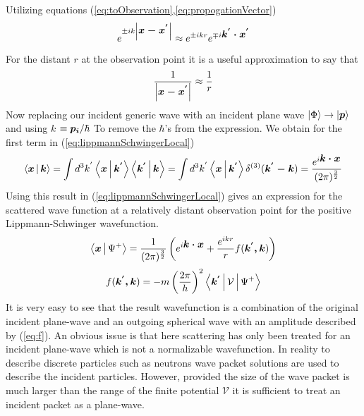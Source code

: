 Utilizing equations (\ref{eq:toObservation},\ref{eq:propogationVector})
\begin{equation}
e^{\pm ik \left|\mbox{\boldmath$x-x^{'}$}\right|} \approx e^{\pm ikr}e^{\mp i \mbox{\boldmath$k^{'}\cdot x^{'}$}}
\label{eq:waveSimplification}
\end{equation}
For the distant $r$ at the observation point it is a useful approximation to say that 
\begin{equation}
\frac{1}{\left|\mbox{\boldmath$x-x^{'}$}\right|} \approx \frac{1}{r}
\end{equation}
Now replacing our incident generic wave with an incident plane wave $\Ket{\Phi}\rightarrow \Ket{\mbox{\boldmath$p$}}$ and using \mbox{\boldmath$k$} $\equiv \mbox{\boldmath$p_i$}/ \hbar$ To remove the $\hbar$'s from the expression.\cite{sakurai} We obtain for the first term in (\ref{eq:lippmannSchwingerLocal}) 
\begin{equation}
\Braket{\mbox{\boldmath$x$}|\mbox{\boldmath$k$}}=\int d^3k^{'} \Braket{\mbox{\boldmath$x$}|\mbox{\boldmath$k^{'}$}}\Braket{\mbox{\boldmath$k^{'}$}|\mbox{\boldmath$k$}}=\int d^3k^{'}  \Braket{\mbox{\boldmath$x$}|\mbox{\boldmath$k^{'}$}} \delta^{(3)}(\mbox{\boldmath$k^{'}-k$})=\frac{e^{i\mbox{\boldmath$k \cdot x$}}}{(2\pi)^{\frac{3}{2}}}
\label{eq:PlaneWave}
\end{equation}
Using this result in (\ref{eq:lippmannSchwingerLocal}) gives an expression for the scattered wave function at a relatively distant observation point for the positive Lippmann-Schwinger wavefunction. 
\begin{equation}
\label{eq:scatteredEquation}
\Braket{\mbox{\boldmath$x$}|\Psi^{+}} = \frac{1}{(2\pi)^{\frac{3}{2}}}\left(e^{i\mbox{\boldmath$k \cdot x$}} + \frac{e^{ikr}}{r}f(\mbox{\boldmath$k^{'},k$})\right)
\end{equation}
\begin{equation}
\label{eq:f}
f(\mbox{\boldmath$k^{'},k$})=-m\left(\frac{2\pi}{h}\right)^2\Braket{\mbox{\boldmath$k^{'}$}|\mathcal{V}|\Psi^{+}}
\end{equation}
It is very easy to see that the result wavefunction is a combination of the original incident plane-wave and an outgoing spherical wave with an amplitude described by (\ref{eq:f}). An obvious issue is that here scattering has only been treated for an incident plane-wave which is not a normalizable wavefunction. In reality to describe discrete particles such as neutrons wave packet solutions are used to describe the incident particles. However, provided the size of the wave packet is much larger than the range of the finite potential $\mathcal{V}$ it is sufficient to treat an incident packet as a plane-wave.  

